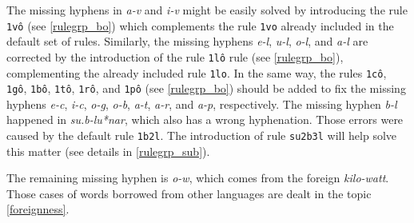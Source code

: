 The missing hyphens in \emph{a-v} and \emph{i-v} might be easily solved by introducing the rule \texttt{1vô} (see \cref{rulegrp_bo}) which 
complements the rule \texttt{1vo} already included in the default set of rules.
Similarly, the missing hyphens \emph{e-l}, \emph{u-l}, \emph{o-l}, and \emph{a-l} are corrected by the introduction of the rule \texttt{1lô} rule (see \cref{rulegrp_bo}),
complementing the already included rule \texttt{1lo}.
In the same way, the rules \texttt{1cô}, \texttt{1gô}, \texttt{1bô}, \texttt{1tô}, \texttt{1rô}, and \texttt{1pô} (see \cref{rulegrp_bo}) 
should be added to fix the missing hyphens \emph{e-c}, \emph{i-c}, \emph{o-g}, \emph{o-b}, \emph{a-t}, \emph{a-r},
and \emph{a-p}, respectively.
%
The missing hyphen \emph{b-l} happened in %
\emph{su.b-lu*nar}, which also has a wrong hyphenation.
Those errors were caused by the default rule \texttt{1b2l}. The introduction of rule \texttt{su2b3l} 
will help solve this matter (see details in \cref{rulegrp_sub}).


The remaining missing hyphen is \emph{o-w}, which comes from the foreign \emph{kilo-watt}.
Those cases of words borrowed from other languages are dealt in the topic \ref{foreignness}.








